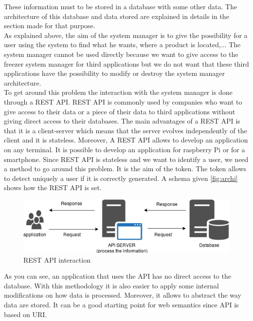 These information must to be stored in a database with some other data. The architecture of this database and data stored are explained in details in the section made for that purpose.\\

As explained above, the aim of the system manager is to give the possibility for a user using the system to find what he wants, where a product is located,... The system manager cannot be used directly because we want to give access to the freezer system manager for third applications but we do not want that these third applications have the possibility to modify or destroy the system manager architecture.\\

To get around this problem the interaction with the system manager is done through a REST API. REST API is commonly used by companies who want to give access to their data or a piece of their data to third applications without giving direct access to their databases. The main advantages of a REST API is that it is a client-server which means that the server evolves independently of the client and it is stateless. Moreover, A REST API allows to develop an application on any terminal. It is possible to develop an application for raspberry Pi or for a smartphone. Since REST API is stateless and we want to identify a user, we need a method to go around this problem. It is the aim of the token. The token allows to detect uniquely a user if it is correctly generated. A schema given \autoref{fig:archi} shows how the REST API is set. \\
\begin{figure}[H]
\centering
\includegraphics[scale=0.5]{./images/archi.png}
\caption{REST API interaction}
\label{fig:archi}
\end{figure}

As you can see, an application that uses the API has no direct access to the database. With this methodology it is also easier to apply some internal modifications on how data is processed. Moreover, it allows to abstract the way data are stored. It can be a good starting point for web semantics since API is based on URI.\\

